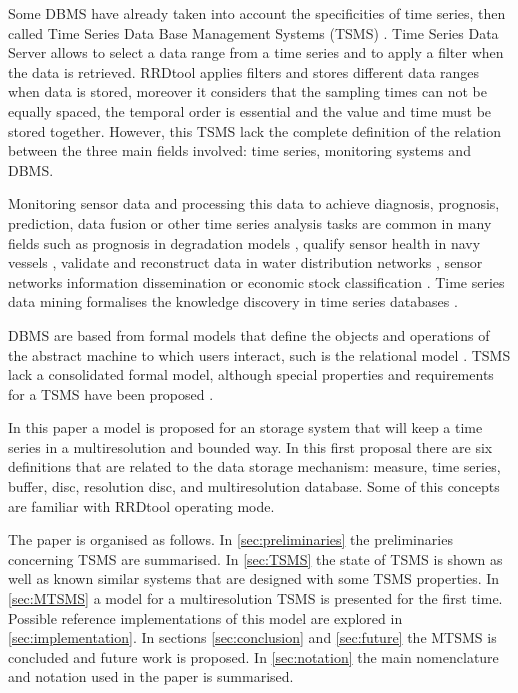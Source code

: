 Some DBMS have already taken into account the specificities of time
series, then called Time Series Data Base Management Systems
(TSMS) \parencite{dreyer94}.  Time Series Data
Server \parencite{weigel10} allows to select a data range from a time
series and to apply a filter when the data is retrieved.
RRDtool \parencite{rrdtool} applies filters and stores different data
ranges when data is stored, moreover it considers that the sampling
times can not be equally spaced, the temporal order is essential and
the value and time must be stored together. However, this TSMS lack
the complete definition of the relation between the three main fields
involved: time series, monitoring systems and DBMS.

Monitoring sensor data and processing this data to achieve diagnosis,
prognosis, prediction, data fusion or other time series analysis tasks are common in many fields such as prognosis in degradation models \parencite{yu11}, qualify sensor health in navy vessels \parencite{palmer07}, validate and reconstruct data in water distribution networks \parencite{quevedo10}, sensor networks information dissemination \parencite{deligiannakis07} or economic stock classification \parencite{dreyer95}. Time series data mining formalises the knowledge discovery in time series databases \parencite{last01}. 


DBMS are based from formal models that define the objects and
operations of the abstract machine to which users interact, such is
the relational model \parencite{date}. TSMS lack a consolidated formal
model, although special properties and requirements for a TSMS
have been proposed \parencite{dreyer94}.

In this paper
a model is proposed for an storage system that will keep a time series
in a multiresolution and bounded way.  In this first proposal there
are six definitions that are related to the data storage mechanism:
measure, time series, buffer, disc, resolution disc, and multiresolution
database. Some of this concepts are familiar with RRDtool
operating mode.



The paper is organised as follows. In \autoref{sec:preliminaries} the preliminaries concerning TSMS are summarised. In \autoref{sec:TSMS} the state of TSMS is shown as well as known similar systems that are designed with some TSMS properties. In \autoref{sec:MTSMS} a model for a multiresolution TSMS is presented for the first time. Possible reference implementations of this model are explored in \autoref{sec:implementation}. In sections \ref{sec:conclusion} and \ref{sec:future}  the MTSMS is concluded and future work is proposed. In \autoref{sec:notation} the main nomenclature and notation used in the paper is summarised. 




